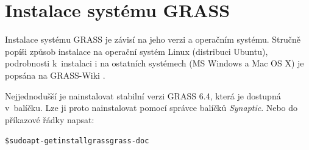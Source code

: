\documentclass[a4paper,12pt,draft]{article}
\newif\ifbc %
\begin{document}
\begin{thebibliography}{99}
\fi


\ifbc
\bibitem{ArcGIS_help}
\textit{ArcGIS Help Library} [online].  c1995-2010 Esri, last modified
9/14/2010 [cit. 2011-04-11].
URL: \textless\url{http://help.arcgis.com/en/arcgisdesktop/10.0/help/index.html}
\textgreater

\bibitem{GMT}
WESSEL, Paul. \textit{The GMT Home Page} [online]. Last modified Wed 09 Mar 2011
[cit. 2011-04-18].
URL: \textless\url{http://www.soest.hawaii.edu/gmt}\textgreater
\fi







\end{thebibliography}





\newpage
\appendix
\pagestyle{plain}
\ifbc
\section{Instalace systému GRASS}
\label{priloha:instalace}
Instalace systému GRASS je závisí na jeho verzi a operačním
systému. Stručně popíši způsob instalace na operační systém Linux
(distribuci Ubuntu), podrobnosti k~instalaci i na ostatních systémech
(MS Windows a Mac OS X) je popsána na GRASS-Wiki \cite{instalace}.

Nejjednodušší je nainstalovat stabilní verzi GRASS 6.4, která je
dostupná v~ba\-líčku. Lze ji proto nainstalovat pomocí správce balíčků
\emph{Synaptic}. Nebo do příkazové řádky napsat:
\begin{alltt}
{\footnotesize \$ sudo apt-get install grass grass-doc}
\end{alltt}
\end{document}
